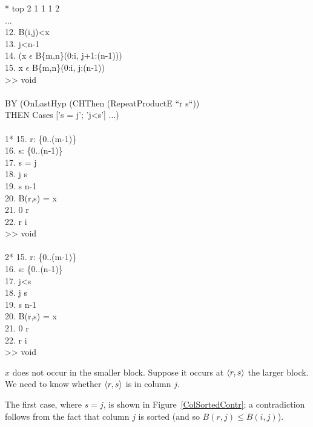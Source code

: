 \begin{RuledFigure}
\begin{Screen}{1}{\SnapshotSize}
\N{}* top 2 1 1 1 2 \\{}
\N{}... \\{}
\N{}12. B(i,j)<x \\{}
\N{}13. j<n-1 \\{}
\N{}14. \mneg{}(x \(\epsilon{}\) B\{m,n\}(0:i, j+1:(n-1))) \\{}
\N{}15. x \(\epsilon{}\) B\{m,n\}(0:i, j:(n-1)) \\{}
\N{}>> void \\{}
\N{} \\{}
\N{}BY (OnLastHyp (CHThen (RepeatProductE ``r s``))  \\{}
\N{}    THEN Cases ['s = j'; 'j<s'] ...) \\{}
\N{}    \\{}
\N{}1* 15. r: \{0..(m-1)\} \\{}
\N{}   16. s: \{0..(n-1)\} \\{}
\N{}   17. s = j \\{}
\N{}   18. j \mleq{} s  \\{}
\N{}   19. s \mleq{} n-1 \\{}
\N{}   20. B(r,s)  =  x \\{}
\N{}   21. 0 \mleq{} r \\{}
\N{}   22. r \mleq{} i \\{}
\N{}   >> void \\{}
\N{} \\{}
\N{}2* 15. r: \{0..(m-1)\} \\{}
\N{}   16. s: \{0..(n-1)\} \\{}
\N{}   17. j<s \\{}
\N{}   18. j \mleq{} s  \\{}
\N{}   19. s \mleq{} n-1 \\{}
\N{}   20. B(r,s)  =  x \\{}
\N{}   21. 0 \mleq{} r \\{}
\N{}   22. r \mleq{} i \\{}
\N{}   >> void    
\end{Screen}%
\caption{$x$ does not occur in the smaller block.  
Suppose it occurs at $\langle r,s \rangle$ the larger block.  
We need to know whether $\langle r,s \rangle$ is in column $j$.}
\label{Gleep} 
\end{RuledFigure}
The first case, where $s=j$, is shown in Figure~\ref{ColSortedContr}; a
contradiction 
follows from the fact that column $j$ is sorted (and so $B(r,j) \leq B(i,j)$).  
